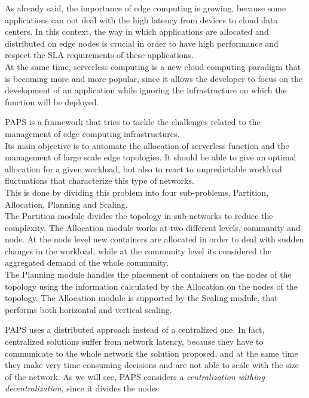 As already said, the importance of edge computing is growing, because some applications can not 
deal with the high latency from devices to cloud data centers.
In this context, the way in which applications are allocated and distributed on
edge nodes is crucial in order to have high performance and respect the SLA requirements
of these applications.
\\
At the same time, serverless computing is a new cloud computing paradigm that is becoming more
and more popular, since it allows the developer to focus on the development of an application
while ignoring the infrastructure on which the function will be deployed.
\par
PAPS \cite{PAPS} is a framework that tries to tackle the challenges related to the management of edge computing infrastructures.
\\
Its main objective is to automate the allocation of serverless function and the management of large scale edge topologies.
It should be able to give an optimal allocation for a given workload, but also
to react to unpredictable workload fluctuations that characterize this type of networks.
\\
This is done by dividing this problem into four sub-problems, Partition, Allocation, Planning and Scaling.
\\
The Partition module divides the topology in sub-networks to reduce the complexity.
The Allocation module works at two different levels, community and node. At the node level new containers
are allocated in order to deal with sudden changes in the workload, while at the community level
its considered the aggregated demand of the whole community.
\\
The Planning module handles the placement of containers on the nodes of the topology using
the information calculated by the Allocation on the nodes of the topology.
The Allocation module is supported by the Scaling module, that performs both horizontal and vertical scaling.
\par
PAPS uses a distributed approach instead of a centralized one.
In fact, centralized solutions
suffer from network latency, because they have to communicate to the whole network the solution proposed,
and at the same time they make very time consuming decisions and are not able to scale  with the size of the network.
As we will see, PAPS considers a  \textit{centralization withing decentralization}, since it divides the nodes
